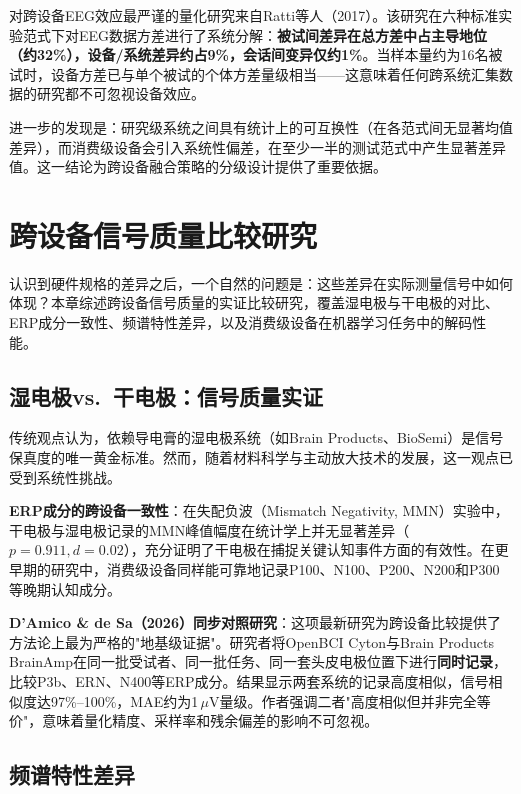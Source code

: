 \documentclass[12pt, a4paper]{article}
\begin{document}
对跨设备EEG效应最严谨的量化研究来自Ratti等人（2017）\citep{Ratti2017systems}。该研究在六种标准实验范式下对EEG数据方差进行了系统分解：\textbf{被试间差异在总方差中占主导地位（约32\%），设备/系统差异约占9\%，会话间变异仅约1\%}。当样本量约为16名被试时，设备方差已与单个被试的个体方差量级相当——这意味着任何跨系统汇集数据的研究都不可忽视设备效应。

进一步的发现是：研究级系统之间具有统计上的可互换性（在各范式间无显著均值差异），而消费级设备会引入系统性偏差，在至少一半的测试范式中产生显著差异值。这一结论为跨设备融合策略的分级设计提供了重要依据。

\section{跨设备信号质量比较研究}
\label{sec:quality}

认识到硬件规格的差异之后，一个自然的问题是：这些差异在实际测量信号中如何体现？本章综述跨设备信号质量的实证比较研究，覆盖湿电极与干电极的对比、ERP成分一致性、频谱特性差异，以及消费级设备在机器学习任务中的解码性能。

\subsection{湿电极vs.\ 干电极：信号质量实证}

传统观点认为，依赖导电膏的湿电极系统（如Brain Products、BioSemi）是信号保真度的唯一黄金标准。然而，随着材料科学与主动放大技术的发展，这一观点已受到系统性挑战。

\textbf{ERP成分的跨设备一致性}：在失配负波（Mismatch Negativity, MMN）实验中，干电极与湿电极记录的MMN峰值幅度在统计学上并无显著差异（$p=0.911, d=0.02$），充分证明了干电极在捕捉关键认知事件方面的有效性\citep{dryWetMMN2024}。在更早期的研究中，消费级设备同样能可靠地记录P100、N100、P200、N200和P300等晚期认知成分\citep{Sabio2024scoping}。

\textbf{D'Amico \& de Sa（2026）同步对照研究}：这项最新研究为跨设备比较提供了方法论上最为严格的"地基级证据"\citep{DAmico2026}。研究者将OpenBCI Cyton与Brain Products BrainAmp在同一批受试者、同一批任务、同一套头皮电极位置下进行\textbf{同时记录}，比较P3b、ERN、N400等ERP成分。结果显示两套系统的记录高度相似，信号相似度达97\%--100\%，MAE约为1\,$\mu$V量级。作者强调二者"高度相似但并非完全等价"，意味着量化精度、采样率和残余偏差的影响不可忽视。

\subsection{频谱特性差异}
\end{document}

